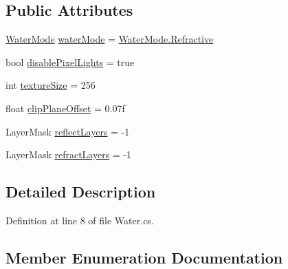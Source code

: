 \subsection*{Public Attributes}
\begin{DoxyCompactItemize}
\item 
\mbox{\hyperlink{class_unity_standard_assets_1_1_water_1_1_water_a9e5d3bf13fa82b48b85d9f90f707379e}{Water\+Mode}} \mbox{\hyperlink{class_unity_standard_assets_1_1_water_1_1_water_a88a2cf28e2e546607d17e7be84a6e046}{water\+Mode}} = \mbox{\hyperlink{class_unity_standard_assets_1_1_water_1_1_water_a9e5d3bf13fa82b48b85d9f90f707379eadced932db1d01033f77c380f76362e2f}{Water\+Mode.\+Refractive}}
\item 
bool \mbox{\hyperlink{class_unity_standard_assets_1_1_water_1_1_water_a40942de7999cdabaf093aa8e981a758e}{disable\+Pixel\+Lights}} = true
\item 
int \mbox{\hyperlink{class_unity_standard_assets_1_1_water_1_1_water_ad71f94b850d1446efe7e07daa8d4f23f}{texture\+Size}} = 256
\item 
float \mbox{\hyperlink{class_unity_standard_assets_1_1_water_1_1_water_a8d9ffae2bf38f3c267e9b40f29bee899}{clip\+Plane\+Offset}} = 0.\+07f
\item 
Layer\+Mask \mbox{\hyperlink{class_unity_standard_assets_1_1_water_1_1_water_ad8e5b877f3c4268919a4b815c495a897}{reflect\+Layers}} = -\/1
\item 
Layer\+Mask \mbox{\hyperlink{class_unity_standard_assets_1_1_water_1_1_water_a25798989345280626fe9a2f9167ee80e}{refract\+Layers}} = -\/1
\end{DoxyCompactItemize}


\subsection{Detailed Description}


Definition at line 8 of file Water.\+cs.



\subsection{Member Enumeration Documentation}
\mbox{\label{class_unity_standard_assets_1_1_water_1_1_water_a9e5d3bf13fa82b48b85d9f90f707379e}} 
